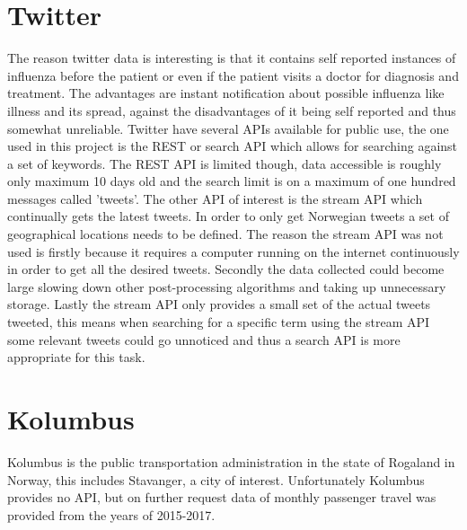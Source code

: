 \section{Twitter}
The reason twitter data is interesting is that it contains self reported instances of influenza before the patient or even if the patient visits a doctor for diagnosis and treatment. The advantages are instant notification about possible influenza like illness and its spread, against the disadvantages of it being self reported and thus somewhat unreliable. Twitter have several APIs available for public use, the one used in this project is the REST or search API which allows for searching against a set of keywords. The REST API is limited though, data accessible is roughly only maximum 10 days old and the search limit is on a maximum of one hundred messages called 'tweets'. The other API of interest is the stream API which continually gets the latest tweets. In order to only get Norwegian tweets a set of geographical locations needs to be defined. The reason the stream API was not used is firstly because it requires a computer running on the internet continuously in order to get all the desired tweets. Secondly the data collected could become large slowing down other post-processing algorithms and taking up unnecessary storage. Lastly the stream API only provides a small set of the actual tweets tweeted, this means when searching for a specific term using the stream API some relevant tweets could go unnoticed and thus a search API is more appropriate for this task.

\section{Kolumbus}
Kolumbus is the public transportation administration in the state of Rogaland in Norway, this includes Stavanger, a city of interest. Unfortunately Kolumbus provides no API, but on further request data of monthly passenger travel was provided from the years of 2015-2017.